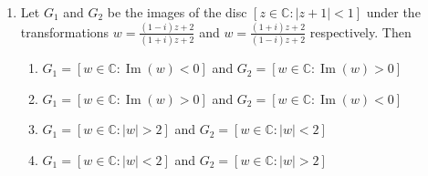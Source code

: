 \documentclass[journal]{IEEEtran}
\newcommand{\brak}[1]{\left( #1 \right)}
\newcommand{\sbrak}[1]{\left[ #1 \right]}
\newcommand{\abs}[1]{\left| #1 \right|}
\newcommand{\lt}{<}
\newcommand{\gt}{>}
\begin{document}
\begin{enumerate}
\item Let $G_1$ and $G_2$ be the images of the disc $\sbrak{z \in \mathbb{C} : \abs{z+1} \lt 1}$ under the transformations
  $
  w = \frac{\brak{1-i}z + 2}{\brak{1+i}z + 2}
  $
  and
  $
  w = \frac{\brak{1+i}z + 2}{\brak{1-i}z + 2}
  $
  respectively. Then  

  \begin{enumerate}
    \item $G_1 = \sbrak{w \in \mathbb{C} : \operatorname{Im}\brak{w} \lt 0}$ and $G_2 = \sbrak{w \in \mathbb{C} : \operatorname{Im}\brak{w} \gt 0}$
    \item $G_1 = \sbrak{w \in \mathbb{C} : \operatorname{Im}\brak{w} \gt 0}$ and $G_2 = \sbrak{w \in \mathbb{C} : \operatorname{Im}\brak{w} \lt 0}$
    \item $G_1 = \sbrak{w \in \mathbb{C} : \abs{w} \gt 2}$ and $G_2 = \sbrak{w \in \mathbb{C} : \abs{w} \lt 2}$
    \item $G_1 = \sbrak{w \in \mathbb{C} : \abs{w} \lt 2}$ and $G_2 = \sbrak{w \in \mathbb{C} : \abs{w} \gt 2}$
  \end{enumerate}


\end{enumerate}
\end{document}
